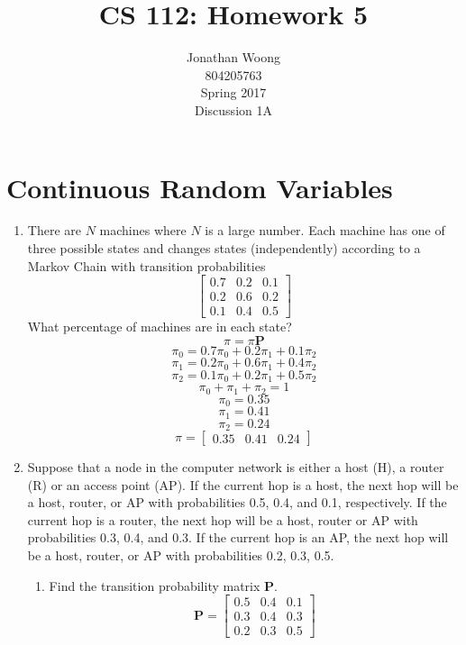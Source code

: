 \documentclass[10.5pt,letterpaper]{article}
\date{\displaydate{date}}
\begin{document}
\title{CS 112: Homework 5}
\author{
	Jonathan Woong\\
	804205763\\
	Spring 2017\\
	Discussion 1A}
\maketitle
\pagebreak


\section{Continuous Random Variables}
\begin{enumerate}[label=\textbf{Problem \arabic*.}]
\item There are $N$ machines where $N$ is a large number. Each machine has one of three possible states and changes states (independently) according to a Markov Chain with transition probabilities
\[
\begin{bmatrix}
0.7 & 0.2 & 0.1 \\
0.2 & 0.6 & 0.2 \\
0.1 & 0.4 & 0.5
\end{bmatrix}
\]
What percentage of machines are in each state?
\[\pi = \pi \textbf{P}\]
\[\pi_0 = 0.7\pi_0 + 0.2\pi_1 + 0.1\pi_2\]
\[\pi_1 = 0.2\pi_0 + 0.6\pi_1 + 0.4\pi_2\]
\[\pi_2 = 0.1\pi_0 + 0.2\pi_1 + 0.5\pi_2\]
\[\pi_0 + \pi_1 + \pi_2 = 1\]
\[\pi_0 = 0.35\]
\[\pi_1 = 0.41\]
\[\pi_2 = 0.24\]
\[\boxed{\pi = \begin{bmatrix}0.35 & 0.41 & 0.24\end{bmatrix}}\]
\item Suppose that a node in the computer network is either a host (H), a router (R) or an access point (AP). If the current hop is a host, the next hop will be a host, router, or AP with probabilities 0.5, 0.4, and 0.1, respectively. If the current hop is a router, the next hop will be a host, router or AP with probabilities 0.3, 0.4, and 0.3. If the current hop is an AP, the next hop will be a host, router, or AP with probabilities 0.2, 0.3, 0.5.
	\begin{enumerate}[label=\alph*)]
	\item Find the transition probability matrix \textbf{P}.
	\[\boxed{\textbf{P} = 
	\begin{bmatrix}
	0.5 & 0.4 & 0.1 \\
	0.3 & 0.4 & 0.3 \\
	0.2 & 0.3 & 0.5 

\end{bmatrix}}\]
\end{enumerate}
\end{enumerate}
\end{document}
